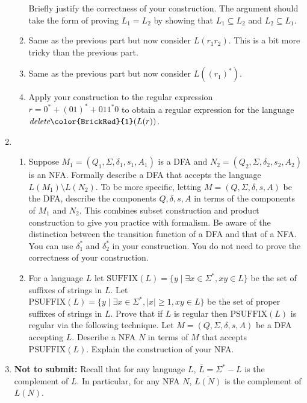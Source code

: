 \documentclass[11pt]{article}
\def\Sym#1{\texttt{\upshape \color{BrickRed} {#1}}}
\begin{document}
\begin{enumerate}
\begin{enumerate}
      Briefly justify the correctness of your construction.
      The argument should take the form of proving $L_1 = L_2$ by
      showing that $L_1 \subseteq L_2$ and $L_2 \subseteq L_1$.

    \item Same as the previous part but now consider $L(r_1r_2)$. This
      is a bit more tricky than the previous part.
    \item Same as the previous part but now consider $L((r_1)^*)$.
    \item Apply your construction to the regular expression
      $r = 0^* + (01)^*+ 011^*0$ to obtain a regular expression for
      the language $\emph{delete}\Sym1(L(r))$.
  \end{enumerate}

\item
  \begin{enumerate}
  \item Suppose $M_1=(Q_1,\Sigma, \delta_1, s_1, A_1)$ is a DFA and
    $N_2=(Q_2,\Sigma, \delta_2, s_2, A_2)$ is an NFA. Formally
    describe a DFA that accepts the language
    $L(M_1) \setminus L(N_2)$. To be more specific, letting
    $M = (Q,\Sigma,\delta,s,A)$ be the DFA, describe the components
    $Q,\delta,s,A$ in terms of the components of $M_1$ and $N_2$.
    This combines subset construction and product construction to give
    you practice with formalism. Be aware of the distinction between
    the transition function of a DFA and that of a NFA. You can use
    $\delta_1^*$ and $\delta_2^*$ in your construction. You do not
    need to prove the correctness of your construction.
  \item For a language $L$ let
    $\text{SUFFIX}(L) = \{ y \mid \exists x \in \Sigma^*, xy \in L\}$ be
    the set of suffixes of strings in $L$.  Let
    $\text{PSUFFIX}(L) = \{ y \mid \exists x \in \Sigma^*, |x| \ge 1, xy
    \in L\}$ be the set of proper suffixes of strings in $L$.  Prove
    that if $L$ is regular then $\text{PSUFFIX}(L)$ is regular via the
    following technique.  Let $M=(Q,\Sigma,\delta,s,A)$ be a DFA
    accepting $L$. Describe a NFA $N$ in terms of $M$ that accepts
    $\text{PSUFFIX}(L)$. Explain the construction of your NFA.
  \end{enumerate}


\item {\bf Not to submit:} Recall that for any language $L$, $\overline{L} = \Sigma^* -
  L$ is the complement of $L$.  In particular, for any NFA $N$,
  $\overline{L(N)}$ is the complement of $L(N)$.



\end{enumerate}
\end{document}
